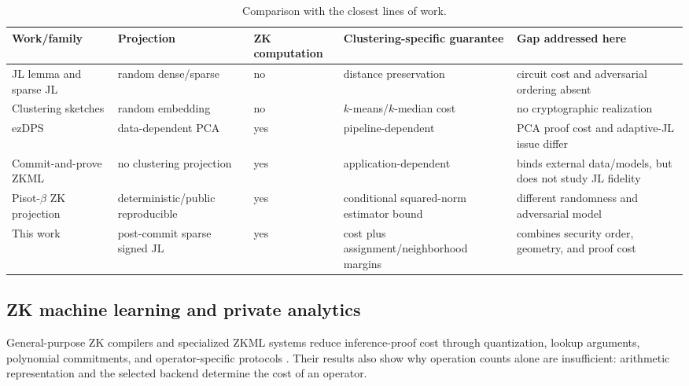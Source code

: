 \documentclass[pdflatex,sn-mathphys-num,iicol]{sn-jnl}
\newcommand{\tpexplain}[1]{}
\theoremstyle{plain}
\theoremstyle{definition}
\theoremstyle{remark}
\begin{document}
\begin{table}[!htbp]
\caption{Comparison with the closest lines of work.}\label{tab:related-a}
\centering\scriptsize
\begin{adjustbox}{max width=\textwidth}
\begin{tabularx}{\textwidth}{@{}Y Y Y Y Y@{}}
\toprule
Work/family & Projection & ZK computation & Clustering-specific guarantee & Gap addressed here \\
\midrule
JL lemma and sparse JL \cite{johnson1984extensions,achlioptas2003database,kane2014sparser} & random dense/sparse & no & distance preservation & circuit cost and adversarial ordering absent \\
Clustering sketches \cite{cohen2015dimensionality,makarychev2019performance} & random embedding & no & $k$-means/$k$-median cost & no cryptographic realization \\
ezDPS \cite{ezdps2023} & data-dependent PCA & yes & pipeline-dependent & PCA proof cost and adaptive-JL issue differ \\
Commit-and-prove ZKML \cite{artemis2024} & no clustering projection & yes & application-dependent & binds external data/models, but does not study JL fidelity \\
Pisot-$\beta$ ZK projection \cite{dey2026pisot} & deterministic/public reproducible & yes & conditional squared-norm estimator bound & different randomness and adversarial model \\
This work & post-commit sparse signed JL & yes & cost plus assignment/neighborhood margins & combines security order, geometry, and proof cost \\
\bottomrule
\end{tabularx}
\end{adjustbox}
\end{table}

\subsection{ZK machine learning and private analytics}
\tpexplain{Two paragraphs. First map generic ZKML compilers and specialized systems; second focus on PCA/clustering. Cite performance claims only after checking artifact versions and hardware.}
General-purpose ZK compilers and specialized ZKML systems reduce inference-proof cost through quantization, lookup arguments, polynomial commitments, and operator-specific protocols \cite{zkmlsurvey2026,zkcnn2021,artemis2024}. Their results also show why operation counts alone are insufficient: arithmetic representation and the selected backend determine the cost of an operator.
\end{document}
